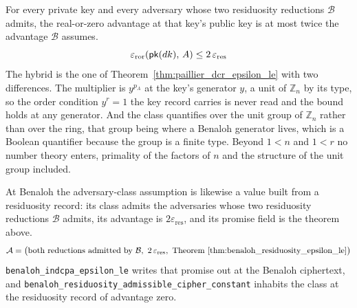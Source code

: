 \begin{theorem}
  \label{thm:benaloh_residuosity_epsilon_le}
  \rocqok
  For every private key and every adversary whose two residuosity reductions
  $\mathcal{B}$ admits, the real-or-zero advantage at that key's public key is
  at most twice the advantage $\mathcal{B}$ assumes.
  \[ \varepsilon_{\mathrm{ror}}(\mathsf{pk}(dk),\,A) \le 2\,\varepsilon_{\mathrm{res}} \]
  The hybrid is the one of Theorem~\ref{thm:paillier_dcr_epsilon_le} with two
  differences. The multiplier is $y^{p_A}$ at the key's generator $y$, a unit
  of $\mathbb{Z}_n$ by its type, so the order condition $y^r = 1$ the key
  record carries is never read and the bound holds at any generator. And the
  class quantifies over the unit group of $\mathbb{Z}_n$ rather than over the
  ring, that group being where a Benaloh generator lives, which is a Boolean
  quantifier because the group is a finite type. Beyond $1 < n$ and $1 < r$ no
  number theory enters, primality of the factors of $n$ and the structure of
  the unit group included.
\end{theorem}

\begin{definition}
  \label{def:benaloh_indcpa_assumption}
  \rocqok
  At Benaloh the adversary-class assumption is likewise a value built from a
  residuosity record: its class admits the adversaries whose two residuosity
  reductions $\mathcal{B}$ admits, its advantage is
  $2\varepsilon_{\mathrm{res}}$, and its promise field is the theorem above.
  \[ \mathcal{A} = \big(\text{both reductions admitted by } \mathcal{B},\
       2\,\varepsilon_{\mathrm{res}},\
       \text{Theorem~\ref{thm:benaloh_residuosity_epsilon_le}}\big) \]
  \texttt{benaloh\_indcpa\_epsilon\_le} writes that promise out at the Benaloh
  ciphertext, and
  \texttt{benaloh\_residuosity\_admissible\_cipher\_constant} inhabits the
  class at the residuosity record of advantage zero.
\end{definition}


